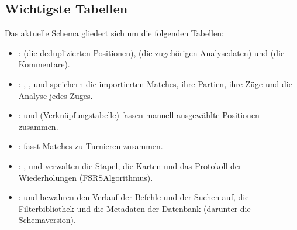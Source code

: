 \documentclass[letterpaper,10pt,german]{sphinxmanual}
\begin{document}
\subsection{Wichtigste Tabellen}
\label{\detokenize{annexe_db_scheme:principales-tables}}
\sphinxAtStartPar
Das aktuelle Schema gliedert sich um die folgenden Tabellen:
\begin{itemize}
\item {} 
\sphinxAtStartPar
{}:  (die deduplizierten Positionen),  (die zugehörigen Analysedaten) und  (die Kommentare).

\item {} 
\sphinxAtStartPar
{}: , ,  und  speichern die importierten Matches, ihre Partien, ihre Züge und die Analyse jedes Zuges.

\item {} 
\sphinxAtStartPar
{}:  und  (Verknüpfungstabelle) fassen manuell ausgewählte Positionen zusammen.

\item {} 
\sphinxAtStartPar
{}:  fasst Matches zu Turnieren zusammen.

\item {} 
\sphinxAtStartPar
{}: ,  und  verwalten die Stapel, die Karten und das Protokoll der Wiederholungen (FSRS\sphinxhyphen{}Algorithmus).

\item {} 
\sphinxAtStartPar
{}:  und  bewahren den Verlauf der Befehle und der Suchen auf,  die Filterbibliothek und  die Metadaten der Datenbank (darunter die Schemaversion).

\end{itemize}
\end{document}
